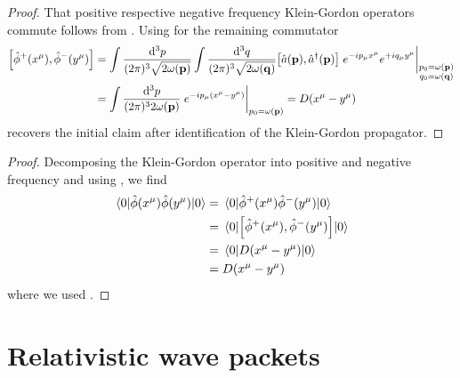 \qkgcommpn
\begin{proof}
	That positive respective negative frequency Klein-Gordon operators commute follows from .
	Using  for the remaining commutator
	\begin{equation*}
		\begin{split}
			\comm{\hat\phi^+(x^\mu)}{\hat\phi^-(y^\mu)}
			&=
			\int\frac{\dd[3]{p}}{(2\pi)^3\sqrt{2\omega(\vb{p})}}
			\int\frac{\dd[3]{q}}{(2\pi)^3\sqrt{2\omega(\vb{q})}}
			\comm{\hat{a}(\vb{p})}{\hat{a}^\dagger(\vb{p})}
			\eval{
				e^{-ip_\mu x^\mu}
				e^{+iq_\mu y^\mu}
			}_{\substack{p_0=\omega(\vb{p})\\q_0=\omega(\vb{q})}}
			\\
			&=
			\int\frac{\dd[3]{p}}{(2\pi)^32\omega(\vb{p})}
			\eval{
				e^{-ip_\mu(x^\mu-y^\mu)}
			}_{p_0=\omega(\vb{p})}
			=
			D(x^\mu-y^\mu)
		\end{split}
	\end{equation*}
	recovers the initial claim after identification of the Klein-Gordon propagator.
\end{proof}
\qkgpropcorr
\begin{proof}
	Decomposing the Klein-Gordon operator into positive and negative frequency and using , we find
	\begin{equation*}
		\begin{split}
			\expval{\hat\phi(x^\mu)\hat\phi(y^\mu)}{0}
			&=
			\expval{\hat\phi^+(x^\mu)\hat\phi^-(y^\mu)}{0}
			\\
			&=
			\expval{\comm{\hat\phi^+(x^\mu)}{\hat\phi^-(y^\mu)}}{0}
			\\
			&=
			\expval{D(x^\mu-y^\mu)}{0}
			\\
			&=
			D(x^\mu-y^\mu)
		\end{split}
	\end{equation*}
	where we used .
\end{proof}

\section{Relativistic wave packets}

